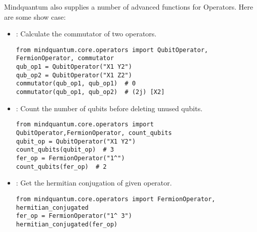 Mindquantum also supplies a number of advanced functions for Operators. Here are some show case:
\begin{itemize}
    \item {} : Calculate the commutator of two operators.
          \begin{lstlisting}
from mindquantum.core.operators import QubitOperator, FermionOperator, commutator
qub_op1 = QubitOperator("X1 Y2")
qub_op2 = QubitOperator("X1 Z2")
commutator(qub_op1, qub_op1)  # 0
commutator(qub_op1, qub_op2)  # (2j) [X2]
    \end{lstlisting}
    \item {} : Count the number of qubits before deleting unused qubits.
          \begin{lstlisting}
from mindquantum.core.operators import QubitOperator,FermionOperator, count_qubits
qubit_op = QubitOperator("X1 Y2")
count_qubits(qubit_op)  # 3
fer_op = FermionOperator("1^")
count_qubits(fer_op)  # 2
    \end{lstlisting}
    \item {} : Get the hermitian conjugation of given operator.
          \begin{lstlisting}
from mindquantum.core.operators import FermionOperator, hermitian_conjugated
fer_op = FermionOperator("1^ 3")
hermitian_conjugated(fer_op)
    \end{lstlisting}
\end{itemize}
